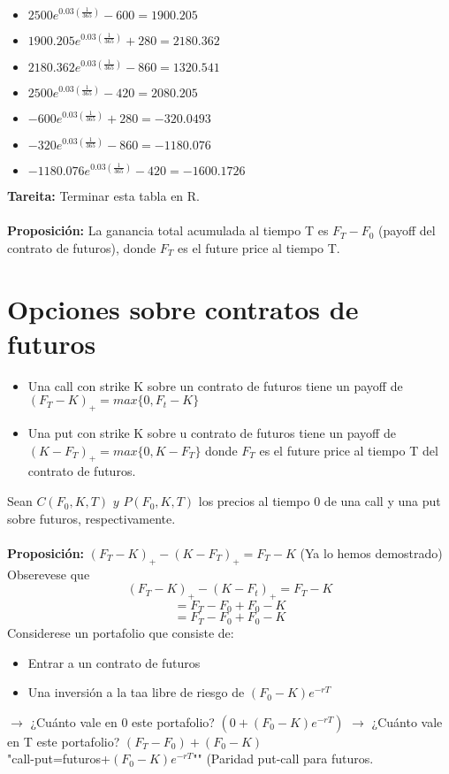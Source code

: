 \documentclass[12pts]{extarticle}
\begin{document}
\begin{itemize} 
\item $2500e^{0.03(\frac{1}{365})}-600=1900.205$
\item  $1900.205e^{0.03(\frac{1}{365})}+280=2180.362$
\item  $2180.362e^{0.03(\frac{1}{365})}-860=1320.541$
\item  $2500e^{0.03(\frac{1}{365})}-420=2080.205$
\item  $-600e^{0.03(\frac{1}{365})}+280=-320.0493$
\item  $-320e^{0.03(\frac{1}{365})}-860=-1180.076$
\item  $-1180.076e^{0.03(\frac{1}{365})}-420=-1600.1726$
\end{itemize}
\textbf{Tareita:} Terminar esta tabla en R. 
\\ \\ 
\textbf{Proposición:} La ganancia total acumulada al tiempo T es $F_T-F_0$ (payoff del contrato de futuros), donde $F_T$ es el future price al tiempo T.

\section{Opciones sobre contratos de futuros} 
\begin{itemize}
\item Una call con strike K sobre un contrato de futuros tiene un payoff de$(F_T-K)_+=max\{0,F_t-K\}$
\item Una put con strike K sobre u contrato de futuros tiene un payoff de $(K-F_T)_+=max\{0,K-F_T\}$ donde $F_T$ es el future price al tiempo T del contrato de futuros.
\end{itemize}
Sean $C(F_0,K,T) \, \, y \, \, P(F_0,K,T)$ los precios al tiempo 0 de una call y una put sobre futuros, respectivamente. \\ \\
\textbf{Proposición:} $(F_T-K)_+ -(K-F_T)_+ = F_T-K$ (Ya lo hemos demostrado) \\
Obserevese que $$(F_T-K)_+-(K-F_t)_+ = F_T-K$$ 
$$=F_T-F_0+F_0-K$$
$$=F_T-F_0+F_0-K$$
Considerese un portafolio que consiste de:
\begin{itemize}
\item Entrar a un contrato de futuros
\item Una inversión a la taa libre de riesgo de $(F_0-K)e^{-rT}$
\end{itemize}
$\rightarrow$ ¿Cuánto vale en 0 este portafolio? $(0+(F_0 -K)e^{-rT})$
$\rightarrow$ ¿Cuánto vale en T este portafolio? $(F_T-F_0)+(F_0-K)$ \\ "call-put=futuros+$(F_0-K)e^{-rT}$"" (Paridad put-call para futuros. 
\\
\end{document}
